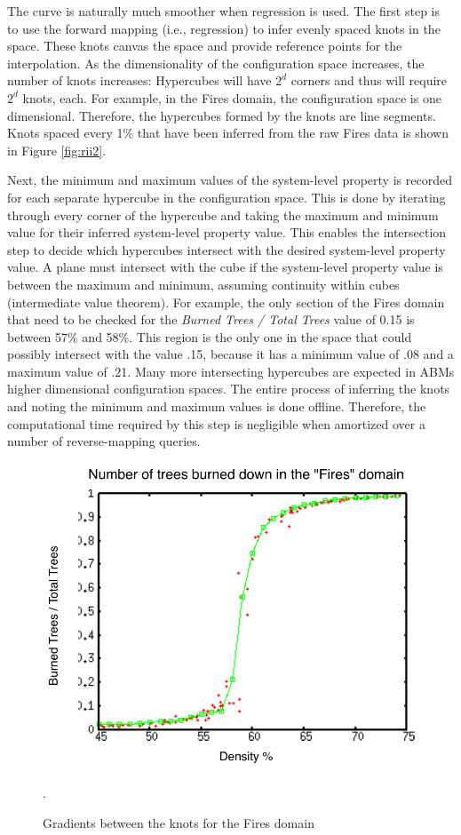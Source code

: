 The curve is naturally much smoother when regression is used.
The first step is to use the forward mapping (i.e., regression) to infer evenly spaced knots in the space.
These knots canvas the space and provide reference points for the interpolation.
As the dimensionality of the configuration space increases, the number of knots increases:
Hypercubes will have $2^d$ corners and thus will require $2^d$ knots, each.
For example, in the Fires domain, the configuration space is one dimensional.
Therefore, the hypercubes formed by the knots are line segments.
Knots spaced every 1\% that have been inferred from the raw Fires data is shown in Figure \ref{fig:rii2}.

Next, the minimum and maximum values of the system-level property is recorded for each separate hypercube in the configuration space.
This is done by iterating through every corner of the hypercube and taking the maximum and minimum value for their inferred system-level property value.
This enables the intersection step to decide which hypercubes intersect with the desired system-level property value.
A plane must intersect with the cube if the system-level property value is between the maximum and minimum, assuming continuity within cubes (intermediate value theorem).
For example, the only section of the Fires domain that need to be checked for the \textit{Burned Trees / Total Trees} value of 0.15 is between 57\% and 58\%.
This region is the only one in the space that could possibly intersect with the value .15, because it has a minimum value of .08 and a maximum value of .21.
Many more intersecting hypercubes are expected in ABMs higher dimensional configuration spaces.
The entire process of inferring the knots and noting the minimum and maximum values is done offline.
Therefore, the computational time required by this step is negligible when amortized over a number of reverse-mapping queries.

\begin{figure}[ht]
\centering
\includegraphics[scale=.66666667]{images/rii3.pdf}
\caption{Gradients between the knots for the Fires domain}.
\label{fig:rii3}
\end{figure}

